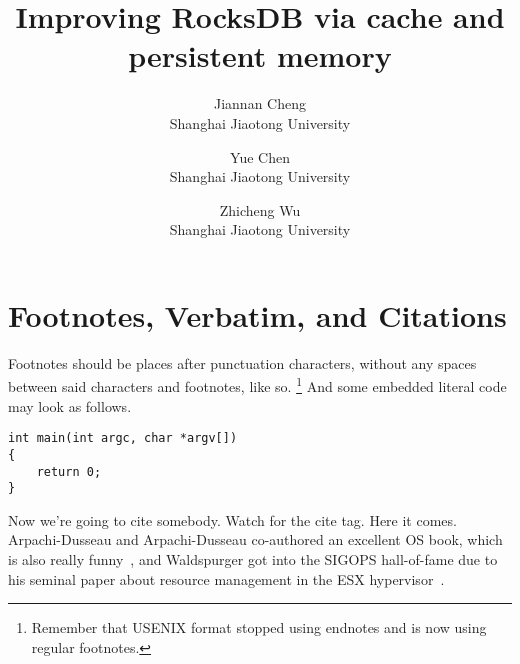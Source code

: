 \documentclass[letterpaper,twocolumn,10pt]{article}
\begin{document}

\date{}

\title{\Large \bf Improving RocksDB via cache and persistent memory}

\author{
{\rm Jiannan Cheng}\\
Shanghai Jiaotong University
\and
{\rm Yue Chen}\\
Shanghai Jiaotong University
\and
{\rm Zhicheng Wu}\\
Shanghai Jiaotong University
} %

\maketitle







\section{Footnotes, Verbatim, and Citations}

Footnotes should be places after punctuation characters, without any
spaces between said characters and footnotes, like so.%
\footnote{Remember that USENIX format stopped using endnotes and is
  now using regular footnotes.} And some embedded literal code may
look as follows.

\begin{verbatim}
int main(int argc, char *argv[]) 
{
    return 0;
}
\end{verbatim}

Now we're going to cite somebody. Watch for the cite tag. Here it
comes. Arpachi-Dusseau and Arpachi-Dusseau co-authored an excellent OS
book, which is also really funny~\cite{arpachiDusseau18:osbook}, and
Waldspurger got into the SIGOPS hall-of-fame due to his seminal paper
about resource management in the ESX hypervisor~\cite{waldspurger02,SLMDB}.
\end{document}
